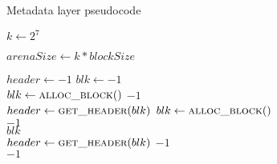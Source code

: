 \documentclass[12pt]{report}
\begin{document}
\begin{algorithm}
    \caption{Metadata layer pseudocode}
    \label{code:mem_meta}
    \begin{algorithmic}[1]

        \State $k \gets 2^7$

        \State $arenaSize \gets k * blockSize$

            \State $header \gets -1$
            \State $blk \gets -1$ \\

            \State $blk \gets \Call{alloc\_block}{ }$
                \State \Return $-1$
            \EndIf\\

            \State $header \gets \Call{get\_header}{blk}$
                \State $blk \gets \Call{alloc\_block}{ }$
            \EndIf\\

                \State \Return $-1$
            \EndIf\\

            \State {}
            \State \Return $blk$
        \EndFunction\\
            \State $header \gets \Call{get\_header}{blk}$
                \State \Return $-1$
            \EndIf\\

                \State \Return $-1$
            \EndIf\\

            \State {}
            \State {}
        \EndFunction
    \end{algorithmic}
\end{algorithm}
\end{document}
